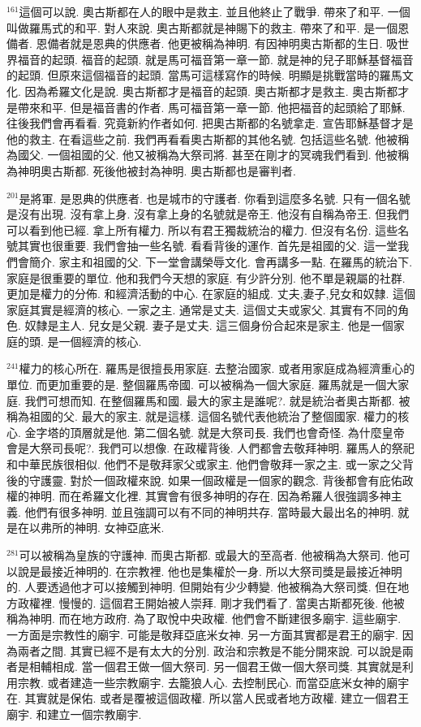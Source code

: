 \documentclass{book}
\begin{document}
$^{161}$這個可以說.
奧古斯都在人的眼中是救主.
並且他終止了戰爭.
帶來了和平.
一個叫做羅馬式的和平.
對人來說.
奧古斯都就是神賜下的救主.
帶來了和平.
是一個恩備者.
恩備者就是恩典的供應者.
他更被稱為神明.
有因神明奧古斯都的生日.
吸世界福音的起頭.
福音的起頭.
就是馬可福音第一章一節.
就是神的兒子耶穌基督福音的起頭.
但原來這個福音的起頭.
當馬可這樣寫作的時候.
明顯是挑戰當時的羅馬文化.
因為希羅文化是說.
奧古斯都才是福音的起頭.
奧古斯都才是救主.
奧古斯都才是帶來和平.
但是福音書的作者.
馬可福音第一章一節.
他把福音的起頭給了耶穌.
往後我們會再看看.
究竟新約作者如何.
把奧古斯都的名號拿走.
宣告耶穌基督才是他的救主.
在看這些之前.
我們再看看奧古斯都的其他名號.
包括這些名號.
他被稱為國父.
一個祖國的父.
他又被稱為大祭司將.
甚至在剛才的冥魂我們看到.
他被稱為神明奧古斯都.
死後他被封為神明.
奧古斯都也是審判者.

$^{201}$是將軍.
是恩典的供應者.
也是城市的守護者.
你看到這麼多名號.
只有一個名號是沒有出現.
沒有拿上身.
沒有拿上身的名號就是帝王.
他沒有自稱為帝王.
但我們可以看到他已經.
拿上所有權力.
所以有君王獨裁統治的權力.
但沒有名份.
這些名號其實也很重要.
我們會抽一些名號.
看看背後的運作.
首先是祖國的父.
這一堂我們會簡介.
家主和祖國的父.
下一堂會講榮辱文化.
會再講多一點.
在羅馬的統治下.
家庭是很重要的單位.
他和我們今天想的家庭.
有少許分別.
他不單是親屬的社群.
更加是權力的分佈.
和經濟活動的中心.
在家庭的組成.
丈夫,妻子,兒女和奴隸.
這個家庭其實是經濟的核心.
一家之主.
通常是丈夫.
這個丈夫或家父.
其實有不同的角色.
奴隸是主人.
兒女是父親.
妻子是丈夫.
這三個身份合起來是家主.
他是一個家庭的頭.
是一個經濟的核心.

$^{241}$權力的核心所在.
羅馬是很擅長用家庭.
去整治國家.
或者用家庭成為經濟重心的單位.
而更加重要的是.
整個羅馬帝國.
可以被稱為一個大家庭.
羅馬就是一個大家庭.
我們可想而知.
在整個羅馬和國.
最大的家主是誰呢?.
就是統治者奧古斯都.
被稱為祖國的父.
最大的家主.
就是這樣.
這個名號代表他統治了整個國家.
權力的核心.
金字塔的頂層就是他.
第二個名號.
就是大祭司長.
我們也會奇怪.
為什麼皇帝會是大祭司長呢?.
我們可以想像.
在政權背後.
人們都會去敬拜神明.
羅馬人的祭祀和中華民族很相似.
他們不是敬拜家父或家主.
他們會敬拜一家之主.
或一家之父背後的守護靈.
對於一個政權來說.
如果一個政權是一個家的觀念.
背後都會有庇佑政權的神明.
而在希羅文化裡.
其實會有很多神明的存在.
因為希羅人很強調多神主義.
他們有很多神明.
並且強調可以有不同的神明共存.
當時最大最出名的神明.
就是在以弗所的神明.
女神亞底米.

$^{281}$可以被稱為皇族的守護神.
而奧古斯都.
或最大的至高者.
他被稱為大祭司.
他可以說是最接近神明的.
在宗教裡.
他也是集權於一身.
所以大祭司獎是最接近神明的.
人要透過他才可以接觸到神明.
但開始有少少轉變.
他被稱為大祭司獎.
但在地方政權裡.
慢慢的.
這個君王開始被人崇拜.
剛才我們看了.
當奧古斯都死後.
他被稱為神明.
而在地方政府.
為了取悅中央政權.
他們會不斷建很多廟宇.
這些廟宇.
一方面是宗教性的廟宇.
可能是敬拜亞底米女神.
另一方面其實都是君王的廟宇.
因為兩者之間.
其實已經不是有太大的分別.
政治和宗教是不能分開來說.
可以說是兩者是相輔相成.
當一個君王做一個大祭司.
另一個君王做一個大祭司獎.
其實就是利用宗教.
或者建造一些宗教廟宇.
去籠狼人心.
去控制民心.
而當亞底米女神的廟宇在.
其實就是保佑.
或者是覆被這個政權.
所以當人民或者地方政權.
建立一個君王廟宇.
和建立一個宗教廟宇.
\end{document}
